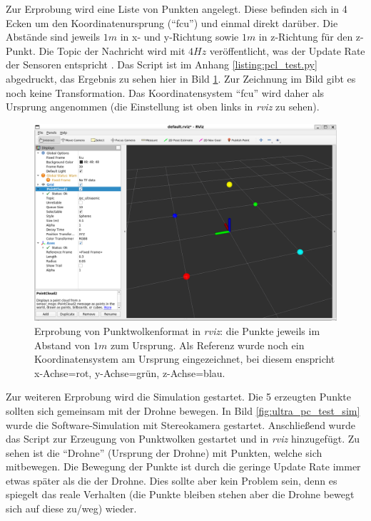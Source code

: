 Zur Erprobung wird eine Liste von Punkten angelegt. Diese befinden sich in 4 Ecken um den Koordinatenursprung (\enquote{fcu}) und einmal direkt darüber. Die Abstände sind jeweils $1m$ in x- und y-Richtung sowie $1m$ in z-Richtung für den z-Punkt. Die Topic der Nachricht wird mit $4Hz$ veröffentlicht, was der Update Rate der Sensoren entspricht \cite[Kapitel 4.4]{markusreinErweiterungBestehenderDrohnen2023}. Das Script ist im Anhang \ref{listing:pcl_test.py} abgedruckt, das Ergebnis zu sehen hier in Bild \ref{fig:ultra_pc_test}. Zur Zeichnung im Bild gibt es noch keine Transformation. Das Koordinatensystem \enquote{fcu} wird daher als Ursprung angenommen (die Einstellung ist oben links in \textit{rviz} zu sehen).

\begin{figure}[!h]
    \centering
    \includegraphics[width=0.7\linewidth]{images/ultra_pc_test.png}
    \caption[Erprobung von Punktwolkenformat]{Erprobung von Punktwolkenformat in \textit{rviz}: die Punkte jeweils im Abstand von $1m$ zum Ursprung. Als Referenz wurde noch ein Koordinatensystem am Ursprung eingezeichnet, bei diesem enspricht x-Achse=rot, y-Achse=grün, z-Achse=blau.}
    \label{fig:ultra_pc_test}
\end{figure}

Zur weiteren Erprobung wird die Simulation gestartet. Die 5 erzeugten Punkte sollten sich gemeinsam mit der Drohne bewegen. In Bild \ref{fig:ultra_pc_test_sim} wurde die Software-Simulation mit Stereokamera gestartet. Anschließend wurde das Script zur Erzeugung von Punktwolken gestartet und in \textit{rviz} hinzugefügt. Zu sehen ist die \enquote{Drohne} (Ursprung der Drohne) mit Punkten, welche sich mitbewegen. Die Bewegung der Punkte ist durch die geringe Update Rate immer etwas später als die der Drohne. Dies sollte aber kein Problem sein, denn es spiegelt das reale Verhalten (die Punkte bleiben stehen aber die Drohne bewegt sich auf diese zu/weg) wieder.

